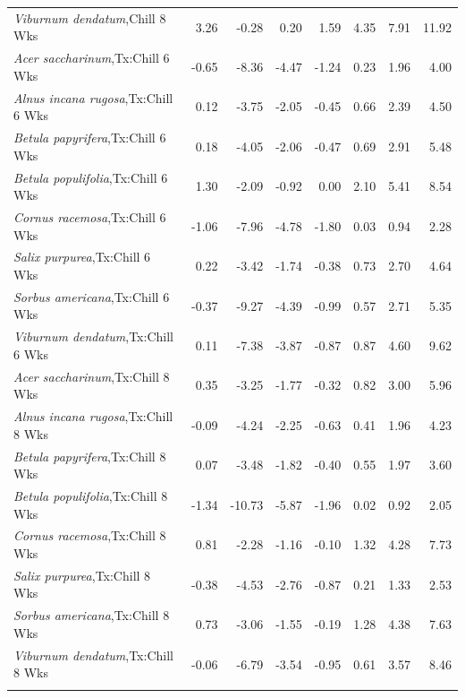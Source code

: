 \documentclass{article}\usepackage[]{graphicx}\usepackage[]{color}
\begin{document}
\begin{longtable}{lrrrrrrr}
  \textit{Viburnum dendatum},Chill 8 Wks & 3.26 & -0.28 & 0.20 & 1.59 & 4.35 & 7.91 & 11.92 \\ 
  \textit{Acer saccharinum},Tx:Chill 6 Wks & -0.65 & -8.36 & -4.47 & -1.24 & 0.23 & 1.96 & 4.00 \\ 
  \textit{Alnus incana rugosa},Tx:Chill 6 Wks & 0.12 & -3.75 & -2.05 & -0.45 & 0.66 & 2.39 & 4.50 \\ 
  \textit{Betula papyrifera},Tx:Chill 6 Wks & 0.18 & -4.05 & -2.06 & -0.47 & 0.69 & 2.91 & 5.48 \\ 
  \textit{Betula populifolia},Tx:Chill 6 Wks & 1.30 & -2.09 & -0.92 & 0.00 & 2.10 & 5.41 & 8.54 \\ 
  \textit{Cornus racemosa},Tx:Chill 6 Wks & -1.06 & -7.96 & -4.78 & -1.80 & 0.03 & 0.94 & 2.28 \\ 
  \textit{Salix purpurea},Tx:Chill 6 Wks & 0.22 & -3.42 & -1.74 & -0.38 & 0.73 & 2.70 & 4.64 \\ 
  \textit{Sorbus americana},Tx:Chill 6 Wks & -0.37 & -9.27 & -4.39 & -0.99 & 0.57 & 2.71 & 5.35 \\ 
  \textit{Viburnum dendatum},Tx:Chill 6 Wks & 0.11 & -7.38 & -3.87 & -0.87 & 0.87 & 4.60 & 9.62 \\ 
  \textit{Acer saccharinum},Tx:Chill 8 Wks & 0.35 & -3.25 & -1.77 & -0.32 & 0.82 & 3.00 & 5.96 \\ 
  \textit{Alnus incana rugosa},Tx:Chill 8 Wks & -0.09 & -4.24 & -2.25 & -0.63 & 0.41 & 1.96 & 4.23 \\ 
  \textit{Betula papyrifera},Tx:Chill 8 Wks & 0.07 & -3.48 & -1.82 & -0.40 & 0.55 & 1.97 & 3.60 \\ 
  \textit{Betula populifolia},Tx:Chill 8 Wks & -1.34 & -10.73 & -5.87 & -1.96 & 0.02 & 0.92 & 2.05 \\ 
  \textit{Cornus racemosa},Tx:Chill 8 Wks & 0.81 & -2.28 & -1.16 & -0.10 & 1.32 & 4.28 & 7.73 \\ 
  \textit{Salix purpurea},Tx:Chill 8 Wks & -0.38 & -4.53 & -2.76 & -0.87 & 0.21 & 1.33 & 2.53 \\ 
  \textit{Sorbus americana},Tx:Chill 8 Wks & 0.73 & -3.06 & -1.55 & -0.19 & 1.28 & 4.38 & 7.63 \\ 
  \textit{Viburnum dendatum},Tx:Chill 8 Wks & -0.06 & -6.79 & -3.54 & -0.95 & 0.61 & 3.57 & 8.46 \\ 
   \hline
\hline
\label{tab:suppmodmeri}
\end{longtable}
\end{document}
